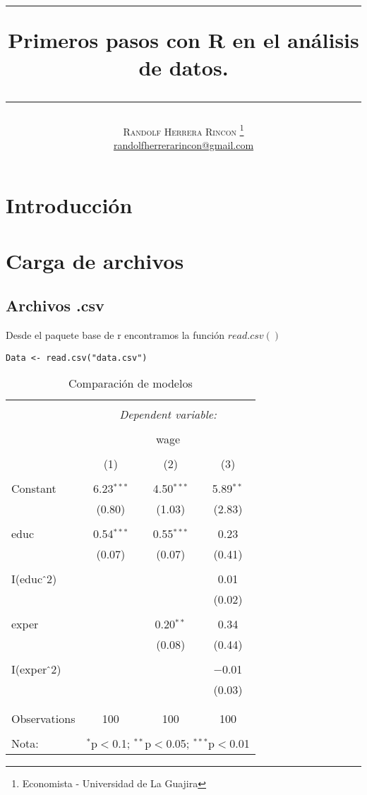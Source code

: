\documentclass[12pt,a4paper]{article}
\title{   \begin{center}\rule{0.9\textwidth}{0.1mm} \end{center}
    {\Huge\textbf{Primeros pasos con R en el análisis de datos.}}
    \begin{center}\rule{0.9\textwidth}{0.1mm} \end{center}
}
\author{\textsc{Randolf Herrera Rincon}
    \thanks{Economista - Universidad de La Guajira}\\
    \normalsize 
    \href{mailto:randolfherrerarincon@gmail.com}{randolfherrerarincon@gmail.com}   
}
\begin{document}
\maketitle
\tableofcontents
\newpage
\section{Introducción}
\newpage
\section{Carga de archivos}
\subsection{Archivos .csv}
Desde el paquete base de r encontramos la función $read.csv()$ \citep{baseR}
\begin{lstlisting}[style=Rstyle, caption={Lectura de datos en R}, label=lst:readcsv]
	Data <- read.csv("data.csv")
\end{lstlisting}



\begin{table}[!htbp] \centering 
	\caption{Comparación de modelos} 
	\label{} 
	\begin{tabular}{@{\extracolsep{5pt}}lccc} 
		\\[-1.8ex]\hline 
		\hline \\[-1.8ex] 
		& \multicolumn{3}{c}{\textit{Dependent variable:}} \\ 
		\cline{2-4} 
		\\[-1.8ex] & \multicolumn{3}{c}{wage} \\ 
		\\[-1.8ex] & (1) & (2) & (3)\\ 
		\hline \\[-1.8ex] 
		Constant & 6.23$^{***}$ & 4.50$^{***}$ & 5.89$^{**}$ \\ 
		& (0.80) & (1.03) & (2.83) \\ 
		& & & \\ 
		educ & 0.54$^{***}$ & 0.55$^{***}$ & 0.23 \\ 
		& (0.07) & (0.07) & (0.41) \\ 
		& & & \\ 
		I(educ$\hat{\mkern6mu}$2) &  &  & 0.01 \\ 
		&  &  & (0.02) \\ 
		& & & \\ 
		exper &  & 0.20$^{**}$ & 0.34 \\ 
		&  & (0.08) & (0.44) \\ 
		& & & \\ 
		I(exper$\hat{\mkern6mu}$2) &  &  & $-$0.01 \\ 
		&  &  & (0.03) \\ 
		& & & \\ 
		\hline \\[-1.8ex] 
		Observations & 100 & 100 & 100 \\ 
		\hline 
		\hline \\[-1.8ex] 
		Nota: & \multicolumn{3}{r}{$^{*}$p$<$0.1; $^{**}$p$<$0.05; $^{***}$p$<$0.01} \\ 
	\end{tabular} 
\end{table}  
\end{document}
